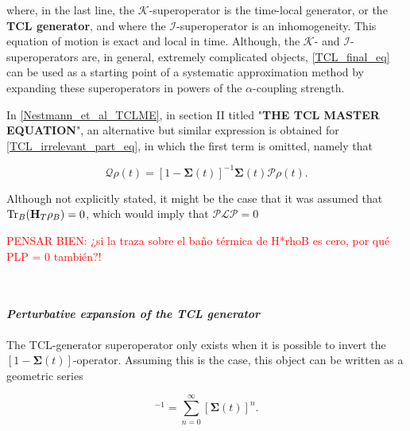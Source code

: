\documentclass{homework}
\begin{document}
where, in the last line, the $\bm{\mathcal{K}}$-superoperator is the time-local generator, or the \textbf{TCL generator}, and where the $\bm{\mathcal{I}}$-superoperator is an inhomogeneity. 
This equation of motion is exact and local in time. Although, the $\bm{\mathcal{K}}$- and $\bm{\mathcal{I}}$-superoperators are, in general, extremely complicated objects, \cref{TCL_final_eq} can be used as a starting point of a systematic approximation method by expanding these superoperators in powers of the $\alpha$-coupling strength. 

\begin{tcolorbox}[colback = cyan, title = Literature Review]

In \ref{Nestmann_et_al_TCLME}, in section II titled "\textbf{THE TCL MASTER EQUATION}", an alternative but similar expression is obtained for \cref{TCL_irrelevant_part_eq}, in which the first term is omitted, namely that 

$$
    \bm{\mathcal{Q}}\rho(t) = [1-\bm{\Sigma}(t)]^{-1}  \bm{\Sigma}(t) \bm{\mathcal{P}}\rho(t). 
$$

Although not explicitly stated, it might be the case that it was assumed that $\Tr_{B} ({\bf H}_T \rho_B) = 0$, which would imply that $\bm{\mathcal{P}} \bm{\mathcal{L}}\bm{\mathcal{P }}= 0$

\textcolor{red}{PENSAR BIEN: ¿si la traza sobre el baño térmica de H*rhoB es cero, por qué PLP = 0 también?!}

\end{tcolorbox}

\blanky \\

\paragraph{\textit{Perturbative expansion of the TCL generator}}

The TCL-generator superoperator only exists when it is possible to invert the $[1- \bm{\Sigma}(t)]$-operator. Assuming this is the case, this object can be written as a geometric series 

\begin{equation}
    [1- \bm{\Sigma}(t)]^{-1} = \sum_{n=0}^{\infty} [ \bm{\Sigma}(t)]^n. 
\end{equation}

\iffalse
\end{document}

